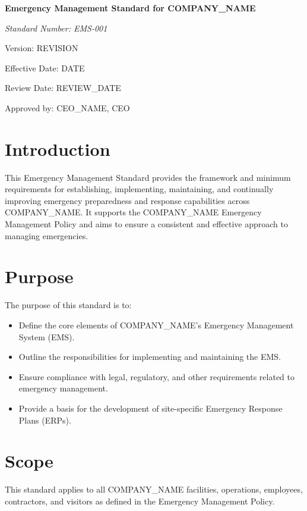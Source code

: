 \documentclass[12pt]{article}
\begin{document}
\begin{titlepage}
    \centering
    \vspace*{2cm}
    {\LARGE\bfseries Emergency Management Standard for {{COMPANY_NAME}}\par}
    \vspace{1cm}
    {\large\itshape Standard Number: EMS-001\par}
    \vspace{0.5cm}
    {\normalsize Version: {{REVISION}}\par}
    \vspace{0.5cm}
    {\normalsize Effective Date: {{DATE}}\par}
    \vspace{0.5cm}
    {\normalsize Review Date: {{REVIEW_DATE}}\par}
    \vspace{2cm}
    {\normalsize Approved by: {{CEO_NAME}}, CEO\par}
\end{titlepage}

\section{Introduction}
This Emergency Management Standard provides the framework and minimum requirements for establishing, implementing, maintaining, and continually improving emergency preparedness and response capabilities across {{COMPANY_NAME}}. It supports the {{COMPANY_NAME}} Emergency Management Policy and aims to ensure a consistent and effective approach to managing emergencies.

\section{Purpose}
The purpose of this standard is to:
\begin{itemize}
    \item Define the core elements of {{COMPANY_NAME}}'s Emergency Management System (EMS).
    \item Outline the responsibilities for implementing and maintaining the EMS.
    \item Ensure compliance with legal, regulatory, and other requirements related to emergency management.
    \item Provide a basis for the development of site-specific Emergency Response Plans (ERPs).
\end{itemize}

\section{Scope}
This standard applies to all {{COMPANY_NAME}} facilities, operations, employees, contractors, and visitors as defined in the Emergency Management Policy.
\end{document}
